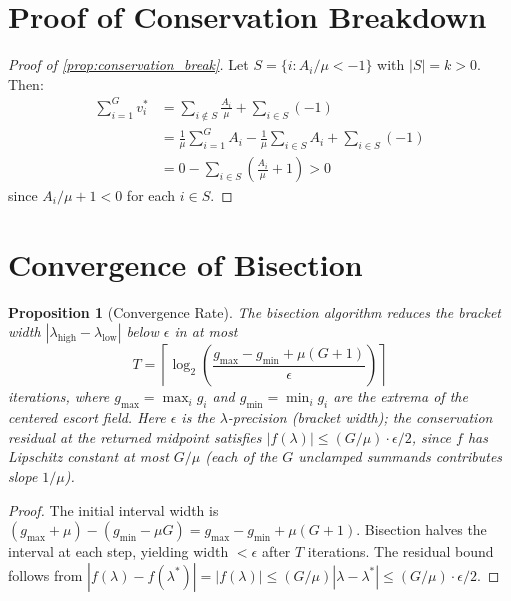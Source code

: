 \documentclass[11pt]{article}
\newtheorem{proposition}[theorem]{Proposition}
\theoremstyle{definition}
\theoremstyle{remark}
\begin{document}
\appendix
\section{Proof of Conservation Breakdown}
\label{app:conservation}

\begin{proof}[Proof of \cref{prop:conservation_break}]
Let $S = \{i : A_i/\mu < -1\}$ with $|S| = k > 0$. Then:
\begin{align}
    \sum_{i=1}^G v_i^* &= \sum_{i \notin S} \frac{A_i}{\mu} + \sum_{i \in S} (-1) \\
    &= \frac{1}{\mu}\sum_{i=1}^G A_i - \frac{1}{\mu}\sum_{i \in S} A_i + \sum_{i \in S}(-1) \\
    &= 0 - \sum_{i \in S}\left(\frac{A_i}{\mu} + 1\right) > 0
\end{align}
since $A_i/\mu + 1 < 0$ for each $i \in S$.
\end{proof}

\section{Convergence of Bisection}
\label{app:bisection}

\begin{proposition}[Convergence Rate]
The bisection algorithm reduces the bracket width $|\lambda_{\text{high}} - \lambda_{\text{low}}|$ below $\epsilon$ in at most
\begin{equation}
    T = \left\lceil \log_2\!\left(\frac{g_{\max} - g_{\min} + \mu(G+1)}{\epsilon}\right) \right\rceil
\end{equation}
iterations, where $g_{\max} = \max_i g_i$ and $g_{\min} = \min_i g_i$ are the extrema of the centered escort field. Here $\epsilon$ is the $\lambda$-precision (bracket width); the conservation residual at the returned midpoint satisfies $|f(\lambda)| \leq (G/\mu)\cdot\epsilon/2$, since $f$ has Lipschitz constant at most $G/\mu$ (each of the $G$ unclamped summands contributes slope $1/\mu$).
\end{proposition}

\begin{proof}
The initial interval width is $(g_{\max} + \mu) - (g_{\min} - \mu G) = g_{\max} - g_{\min} + \mu(G+1)$. Bisection halves the interval at each step, yielding width $< \epsilon$ after $T$ iterations. The residual bound follows from $|f(\lambda) - f(\lambda^*)| = |f(\lambda)| \leq (G/\mu)|\lambda - \lambda^*| \leq (G/\mu) \cdot \epsilon/2$.
\end{proof}
\end{document}
